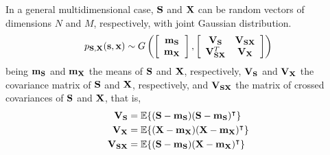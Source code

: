 {In a general multidimensional case, ${\bf S}$ and ${\bf X}$ can be random vectors of dimensions $N$ and $M$, respectively, with joint Gaussian distribution.
\begin{equation}
p_{{\bf S},{\bf X}}({\bf s},{\bf x}) 
   \sim G\left(\left[\begin{array}{c} {\bf m_S} \\ {\bf m_X} \end{array}\right],
               \left[\begin{array}{cc} {\bf V_S}          & {\bf V_{SX}}   \\ 
                                       {\bf V}_{\bf SX}^T & {\bf V_{X}}   
                     \end{array}\right]\right)
\end{equation}
being ${\bf m_S}$ and ${\bf m_X}$ the means of $ {\bf S}$ and $ {\bf X}$, respectively, ${\bf V_S}$ and ${\bf V_X}$ the covariance matrix of ${\bf S}$ and  ${\bf X}$, respectively, and ${\bf V_{SX}}$ the matrix of crossed covariances of ${\bf S}$ and ${\bf X}$, that is,
\begin{align}
{\bf V_S} &= \mathbb{E}\{({\bf S}-{\bf m_S})({\bf S}-{\bf m_S})^\intercal\} \\
{\bf V_X} &= \mathbb{E}\{({\bf X}-{\bf m_X})({\bf X}-{\bf m_X})^\intercal\} \\
{\bf V_{SX}} &= \mathbb{E}\{({\bf S}-{\bf m_S})({\bf X}-{\bf m_X})^\intercal\}
\end{align}
}
